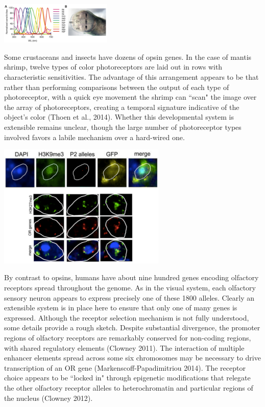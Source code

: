 \documentclass{article}
\begin{document}
\begin{center}
\includegraphics[width=0.4\textwidth]{mantis_opsins.pdf}
\end{center}

Some crustaceans and insects have dozens of opsin genes. In the case of mantis shrimp, twelve types of color photoreceptors are laid out in rows with characteristic sensitivities. The advantage of this arrangement appears to be that rather than performing comparisons between the output of each type of photoreceptor, with a quick eye movement the shrimp can ``scan" the image over the array of photoreceptors, creating a temporal signature indicative of the object's color (Thoen et al., 2014). Whether this developmental system is extensible remains unclear, though the large number of photoreceptor types involved favors a labile mechanism over a hard-wired one.

\begin{center}
\includegraphics[width=0.6\textwidth]{or_localization.pdf}
\end{center}

By contrast to opsins, humans have about nine hundred genes encoding olfactory receptors spread throughout the genome. As in the visual system, each olfactory sensory neuron appears to express precisely one of these 1800 alleles. Clearly an extensible system is in place here to ensure that only one of many genes is expressed. Although the receptor selection mechanism is not fully understood, some details provide a rough sketch. Despite substantial divergence, the promoter regions of olfactory receptors are remarkably conserved for non-coding regions, with shared regulatory elements (Clowney 2011). The interaction of multiple enhancer elements spread across some six chromosomes may be necessary to drive transcription of an OR gene (Markenscoff-Papadimitriou 2014).
The receptor choice appears to be ``locked in" through epigenetic modifications that relegate the other olfactory receptor alleles to heterochromatin and particular regions of the nucleus (Clowney 2012).
\end{document}
